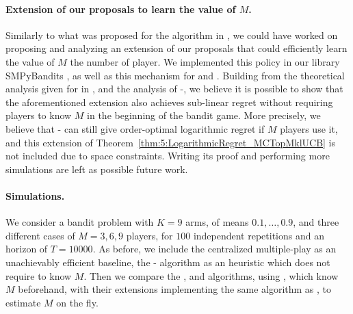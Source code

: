 \paragraph{Extension of our proposals to learn the value of $M$.}

Similarly to what was proposed for the \rhoRandEst{} algorithm in \cite{Anandkumar11}, we could have worked on proposing and analyzing an extension of our proposals that could efficiently learn the value of $M$ the number of player.
We implemented this \rhoRandEst{} policy in our library SMPyBandits \cite{SMPyBandits}, as well as this mechanism for \RandTopM{} and \MCTopM.
Building from the theoretical analysis given for \rhoRandEst{} in \cite{Anandkumar11}, and the analysis of \MCTopM-\klUCB, we believe it is possible to show that the aforementioned extension also achieves sub-linear regret without requiring players to know $M$ in the beginning of the bandit game.
More precisely, we believe that \MCTopM-\klUCB{} can still give order-optimal logarithmic regret if $M$ players use it, and this extension of Theorem~\ref{thm:5:LogarithmicRegret_MCTopMklUCB} is not included due to space constraints.
Writing its proof and performing more simulations are left as possible future work.

\paragraph{Simulations.}

We consider a bandit problem with $K=9$ arms, of means $0.1,\dots,0.9$, and three different cases of $M=3,6,9$ players, for $100$ independent repetitions and an horizon of $T=10000$.
As before, we include the centralized multiple-play \klUCB{} as an unachievably efficient baseline, the \Selfish-\klUCB{} algorithm as an heuristic which does not require to know $M$.
Then we compare the \RhoRand, \RandTopM{} and \MCTopM{} algorithms, using \klUCB, which know $M$ beforehand, with their extensions implementing the same algorithm as \rhoRandEst, to estimate $M$ on the fly.




